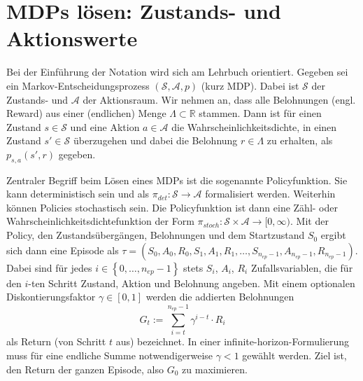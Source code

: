 \section{MDPs lösen: Zustands- und Aktionswerte}
\label{section:mdp_fundamentals}
Bei der Einführung der Notation wird sich am Lehrbuch \cite{Sutton1998} orientiert.
Gegeben sei ein Markov-Entscheidungsprozess $(\mathcal{S}, \mathcal{A}, p)$ (kurz MDP).
Dabei ist $\mathcal{S}$ der Zustands- und $\mathcal{A}$ der Aktionsraum.
Wir nehmen an, dass alle Belohnungen (engl. Reward) aus einer (endlichen) Menge $\Lambda \subset \mathbb{R}$ stammen.
Dann ist für einen Zustand \mbox{$s\in \mathcal{S}$} und eine Aktion \mbox{$a \in \mathcal{A}$} die Wahrscheinlichkeitsdichte, in einen Zustand $s' \in \mathcal{S}$ überzugehen und dabei die Belohnung $r \in \Lambda$ zu erhalten, als $p_{s,a}(s', r)$ gegeben.

Zentraler Begriff beim Lösen eines MDPs ist die sogenannte Policyfunktion.
Sie kann deterministisch sein und als \mbox{$\pi_{det}: \mathcal{S} \rightarrow \mathcal{A}$} formalisiert werden.
Weiterhin können Policies stochastisch sein.
Die Policyfunktion ist dann eine Zähl- oder Wahrscheinlichkeitsdichtefunktion der Form \mbox{$\pi_{stoch}: \mathcal{S}\times\mathcal{A}\rightarrow [0, \infty)$}.
Mit der Policy, den Zustandsübergängen, Belohnungen und dem Startzustand $S_0$ ergibt sich dann eine Episode als \mbox{$\tau = \left(S_0, A_0, R_0, S_1, A_1, R_1, \dots, S_{n_{ep} - 1}, A_{n_{ep} - 1}, R_{n_{ep} - 1}\right)$}.
Dabei sind für jedes \mbox{$i \in \left\lbrace0, \dots, n_{ep} - 1\right\rbrace$} stets $S_i$, $A_i$, $R_i$ Zufallsvariablen, die für den $i$-ten Schritt Zustand, Aktion und Belohnung angeben.
Mit einem optionalen Diskontierungsfaktor $\gamma \in [0, 1]$ werden die addierten Belohnungen
\begin{equation}
	G_t := \sum_{i=t}^{n_{ep} - 1} \gamma^{i - t} \cdot R_i
\end{equation}
als Return (von Schritt $t$ aus) bezeichnet.
In einer infinite-horizon-Formulierung muss für eine endliche Summe notwendigerweise $\gamma < 1$ gewählt werden.
Ziel ist, den Return der ganzen Episode, also $G_0$ zu maximieren.


